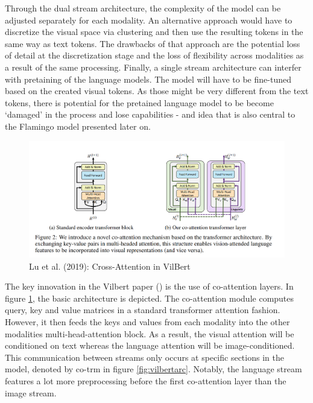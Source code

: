 \documentclass[
]{krantz}
\begin{document}
Through the dual stream architecture, the complexity of the model can be adjusted separately for each modality. An alternative approach would have to discretize the visual space via clustering and then use the resulting tokens in the same way as text tokens. The drawbacks of that approach are the potential loss of detail at the discretization stage and the loss of flexibility across modalities as a result of the same processing. Finally, a single stream architecture can interfer with pretaining of the language models. The model will have to be fine-tuned based on the created visual tokens. As those might be very different from the text tokens, there is potential for the pretained language model to be become `damaged' in the process and lose capabilities - and idea that is also central to the Flamingo model presented later on.

\begin{figure}

{\centering \includegraphics[width=1\linewidth]{figures/05-chapter2/vilbertattention} 

}

\caption{Lu et al. (2019): Cross-Attention in VilBert}\label{fig:vilbertattention}
\end{figure}

The key innovation in the Vilbert paper (\citet{lu2019vilbert}) is the use of co-attention layers.
In figure \ref{fig:vilbertattention}, the basic architecture is depicted. The co-attention module computes query, key and value matrices in a standard transformer attention fashion. However, it then feeds the keys and values from each modality
into the other modalities multi-head-attention block. As a result, the visual attention will be conditioned on text whereas the language attention will be image-conditioned. This communication between streams only occurs at
specific sections in the model, denoted by co-trm in figure \ref{fig:vilbertarc}. Notably, the language stream features a lot more preprocessing before the first co-attention layer than the image stream.
\end{document}

